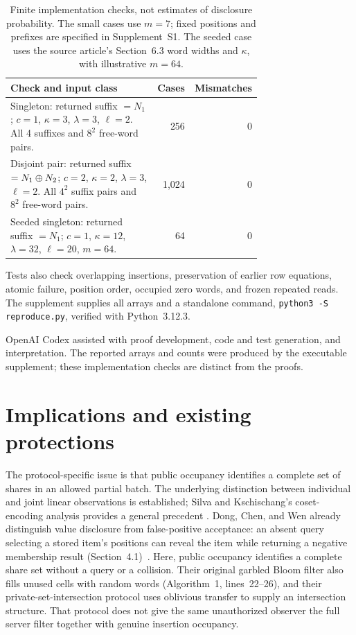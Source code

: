 \begin{table}[ht]
\centering
\small
\begin{tabular}{@{}>{\raggedright\arraybackslash}p{0.72\linewidth}rr@{}}
\toprule
Check and input class & Cases & Mismatches\\
\midrule
Singleton: returned suffix $=N_1$; $c=1$, $\kappa=3$,
$\lambda=3$, $\ell=2$. All 4 suffixes and $8^2$ free-word pairs.
& 256 & 0\\[3pt]
Disjoint pair: returned suffix $=N_1\mathbin{\oplus} N_2$; $c=2$, $\kappa=2$,
$\lambda=3$, $\ell=2$. All $4^2$ suffix pairs and $8^2$ free-word pairs.
& 1,024 & 0\\[3pt]
Seeded singleton: returned suffix $=N_1$; $c=1$, $\kappa=12$,
$\lambda=32$, $\ell=20$, $m=64$.
& 64 & 0\\
\bottomrule
\end{tabular}
\caption{Finite implementation checks, not estimates of disclosure probability.
The small cases use $m=7$; fixed positions and prefixes are specified in
Supplement~S1. The seeded case uses the source article's Section~6.3 word widths
and $\kappa$, with illustrative $m=64$.}
\label{tab:checks}
\end{table}

Tests also check overlapping insertions, preservation of earlier row equations,
atomic failure, position order, occupied zero words, and frozen repeated reads.
The supplement supplies all arrays and a standalone command,
\texttt{python3 -S reproduce.py}, verified with Python~3.12.3.

OpenAI Codex assisted with proof development, code and test generation, and
interpretation. The reported arrays and counts were produced by the executable
supplement; these implementation checks are distinct from the proofs.

\section{Implications and existing protections}

The protocol-specific issue is that public occupancy identifies a complete
set of shares in an allowed partial batch. The underlying distinction between
individual and joint linear observations is established; Silva and
Kschischang's coset-encoding analysis provides a general precedent
\cite{silva2011universal}. Dong, Chen, and Wen already distinguish value
disclosure from false-positive acceptance: an absent query selecting a stored item's
positions can reveal the item while returning a negative membership result
(Section~4.1)~\cite{dong2013gbf}. Here, public occupancy identifies a complete
share set without a query or a collision. Their original garbled Bloom filter
also fills unused cells with random words (Algorithm~1, lines~22--26), and their
private-set-intersection protocol uses oblivious transfer to supply an
intersection structure.
That protocol does not give the same unauthorized observer the full server
filter together with genuine insertion occupancy.

